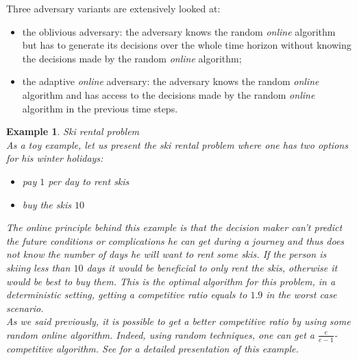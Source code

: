 \documentclass[a4paper]{book}
\newtheorem{ex}{Example}[chapter]
\begin{document}
Three adversary variants are extensively looked at:
\begin{itemize}
    \item the oblivious adversary: the adversary knows the random \emph{online} algorithm but has to generate its decisions over the whole time horizon without knowing the decisions made by the random \emph{online} algorithm;
    \item the adaptive \emph{online} adversary: the adversary knows the random \emph{online} algorithm and has access to the decisions made by the random \emph{online} algorithm in the previous time steps.
\end{itemize}
\begin{ex}
Ski rental problem\\
As a toy example, let us present the {\sc ski rental} problem where one has two options for his winter holidays: 
\begin{itemize}
    \item pay $1$ per day to rent skis
    \item buy the skis $10$
\end{itemize}
The online principle behind this example is that the decision maker can't predict the future conditions or complications he can get during a journey and thus does not know the number of days he will want to rent some skis. If the person is skiing less than $10$ days it would be beneficial to only rent the skis, otherwise it would be best to buy them. This is the optimal algorithm for this problem, in a deterministic setting, getting a competitive ratio equals to $1.9$ in the worst case scenario.  \\
As we said previously, it is possible to get a better competitive ratio by using some random \emph{online} algorithm. Indeed, using random techniques, one can get a $\frac{e}{e-1}$-competitive algorithm. See \cite{KarlinMMO90} for a detailed presentation of this example. 
\end{ex}
\end{document}
